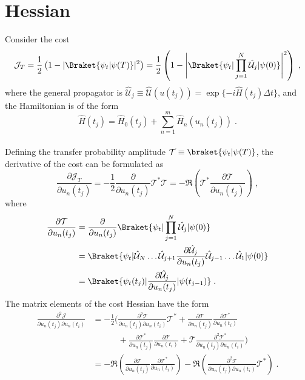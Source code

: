 \chapter{Hessian} \label{chap:Hessian}

Consider the cost
\begin{equation}
	\mathcal{J}_T = \frac{1}{2} \left( 1- |\Braket{\psi_t | \psi (T)}|^2 \right)  = \frac{1}{2} \left( 1- \Bigg|\Braket{\psi_t | \prod_{j = 1}^{N} \hat{\mathcal{U}}_j |\psi (0)} \Bigg| ^2 \right) \; ,
\end{equation}
where the general propagator is $\hat{\mathcal{U}}_j \equiv \hat{\mathcal{U}} (u(t_j)) = \exp \{ -i \hat{H} (t_j) \Delta t \}$, and the Hamiltonian is of the form
\begin{equation}
	\hat{H}(t_j) =  \hat{H}_0 (t_j) + \sum_{n = 1}^{m}  \hat{H}_n (u_n (t_j)) \; .
\end{equation}\\
Defining the transfer probability amplitude $\mathcal{T} \equiv \braket{\psi_t | \psi (T)}$, the derivative of the cost can be formulated as
\begin{equation}
	\frac{\partial \mathcal{J}_T}{\partial u_n (t_j)} = - \frac{1}{2} \frac{\partial}{\partial u_n (t_j)}  \mathcal{T}^* \mathcal{T}   = - \Re \left( \mathcal{T}^* \frac{\partial \mathcal{T}}{\partial u_n (t_j)} \right) \; ,
\end{equation}
where
\begin{align}
	\frac{\partial \mathcal{T}}{\partial u_n (t_j)} &= \frac{\partial }{\partial u_n (t_j)} \Braket{\psi_t | \prod_{j = 1}^{N} \hat{\mathcal{U}}_j | \psi (0)} \nonumber \\
	&= \Braket{\psi_t | \hat{\mathcal{U}}_N \ldots \hat{\mathcal{U}}_{j+1} \frac{\partial \hat{\mathcal{U}}_{j}}{\partial u_n (t_j)} \hat{\mathcal{U}}_{j-1} \ldots \hat{\mathcal{U}}_{1} | \psi (0)} \nonumber \\
	&= \Braket{\psi_t (t_j) |  \frac{\partial \hat{\mathcal{U}}_{j}}{\partial u_n (t_j)}  | \psi (t_{j-1})} \; .
	\label{eq:singleDerivT}
\end{align}
The matrix elements of the cost Hessian have the form
\begin{align}
	\frac{\partial^2 \mathcal{J}}{\partial u_n (t_j) \partial u_n (t_i)} &= - \frac{1}{2} \bigg( \frac{\partial^2 \mathcal{T}}{\partial u_n (t_j)   \partial u_n (t_i)} \mathcal{T}^* + \frac{\partial \mathcal{T}}{\partial u_n (t_j)} \frac{\partial \mathcal{T}^*}{\partial u_n (t_i)} \nonumber \\
	&\qquad \quad + \frac{\partial \mathcal{T}^*}{\partial u_n (t_j)} \frac{\partial \mathcal{T}}{\partial u_n (t_i)} + \mathcal{T} \frac{\partial^2 \mathcal{T}^*}{\partial u_n (t_j)   \partial u_n (t_i)} \bigg) \nonumber \\
	&= - \Re \left( \frac{\partial \mathcal{T}}{\partial u_n (t_j)} \frac{\partial \mathcal{T}^*}{\partial u_n (t_i)} \right) - \Re \left( \frac{\partial^2 \mathcal{T}}{\partial u_n (t_j)   \partial u_n (t_i)} \mathcal{T}^* \right) \; .
\end{align}
